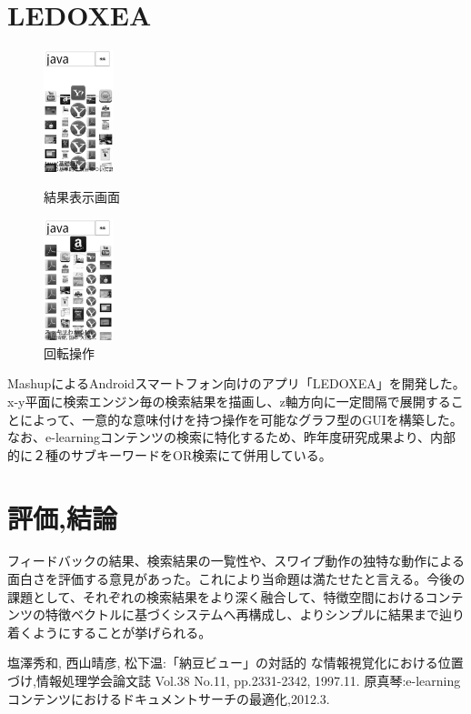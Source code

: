\documentclass[twocolumn,a4j]{jarticle}
\begin{document}
\section{LEDOXEA}
\begin{figure}[htbp]
 \begin{minipage}{0.45\hsize}
  \begin{center}
   \includegraphics[width=20mm]{eps/ledoxea01.eps}
  \end{center}
  \caption{結果表示画面}
  \label{le01}
 \end{minipage}
 \begin{minipage}{0.45\hsize}
  \begin{center}
   \includegraphics[width=20mm]{eps/ledoxea02.eps}
  \end{center}
  \caption{回転操作}
  \label{le02}
 \end{minipage}
\end{figure}
MashupによるAndroidスマートフォン向けのアプリ「LEDOXEA」を開発した。x-y平面に検索エンジン毎の検索結果を描画し、z軸方向に一定間隔で展開することによって、一意的な意味付けを持つ操作を可能なグラフ型のGUIを構築した。なお、e-learningコンテンツの検索に特化するため、昨年度研究成果\cite{docsearch}より、内部的に２種のサブキーワードをOR検索にて併用している。
\vspace{-5mm}
\section{評価,結論}
フィードバックの結果、検索結果の一覧性や、スワイプ動作の独特な動作による面白さを評価する意見があった。これにより当命題は満たせたと言える。今後の課題として、それぞれの検索結果をより深く融合して、特徴空間におけるコンテンツの特徴ベクトルに基づくシステムへ再構成し、よりシンプルに結果まで辿り着くようにすることが挙げられる。
\vspace{-5mm}
\begin{thebibliography}{9}\setlength{\itemsep}{2ex}\small
{} 塩澤秀和, 西山晴彦, 松下温:「納豆ビュー」の対話的 な情報視覚化における位置づけ,情報処理学会論文誌 Vol.38 No.11, pp.2331-2342, 1997.11.
 原真琴:e-learningコンテンツにおけるドキュメントサーチの最適化,2012.3.

\end{thebibliography}
\end{document}
